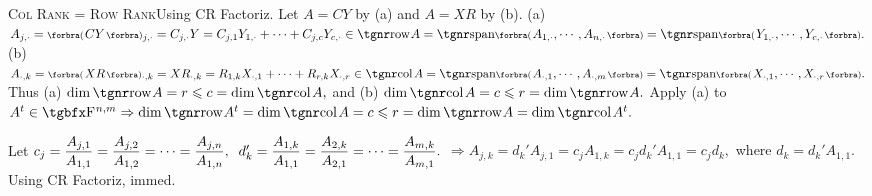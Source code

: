\SepLine

\BulletPointX\textsc{Col Rank = Row Rank}\quad Using CR Factoriz. Let $A=CY$ by (a) and $A=XR$ by (b).\TextB{}
(a) $A_{j,\cdot}=\BigPar{CY}{_{j,\cdot}}=C_{j,\cdot}Y=C_{j,1}Y_{1,\cdot}+\dots+C_{j,c}Y_{c,\cdot}\in\row A=\Span[\BigPar]{A_{1,\cdot},\cdots,A_{n,\cdot}}=\Span[\BigPar]{Y_{1,\cdot},\cdots,Y_{c,\cdot}}.$\TextB{}
(b) $A_{\cdot,k}=\BigPar{XR}{_{\cdot,k}}=XR_{\cdot,k}=R_{1,k}X_{\cdot,1}+\dots+R_{r,k}X_{\cdot,r}\in\col A=\Span[\BigPar]{A_{\cdot,1},\cdots,A_{\cdot,m}}=\Span[\BigPar]{X_{\cdot,1},\cdots,X_{\cdot,r}}.$\TextB{}
Thus (a) $\dim\row A=r\leqslant c=\dim\col A,$ and (b) $\dim\col A=c\leqslant r=\dim\row A.$\vspace{2pt}\PfEnd\TextB{}
\Or Apply (a) to $A^t\in\FbbP{n,m}\Rightarrow\dim\row A^t=\dim\col A=c\leqslant r=\dim\row A=\dim\col A^t.$\PfEnd
\SepLine

Let $c_j={\displaystyle{\frac{A_{j,1}}{A_{1,1}}}}={\displaystyle{\frac{A_{j,2}}{A_{1,2}}}}=\dots={\displaystyle{\frac{A_{j,n}}{A_{1,n}}}},\;\;d_k'={\displaystyle{\frac{A_{1,k}}{A_{1,1}}}}={\displaystyle{\frac{A_{2,k}}{A_{2,1}}}}=\dots={\displaystyle{\frac{A_{m,k}}{A_{m,1}}}}.$\vspace{4pt}\parSol{}
{$\Rightarrow A_{j,k}=d_k' A_{j,1}=c_j A_{1,k}=c_j d_k' A_{1,1}=c_j d_k,$ where $d_k=d_k' A_{1,1}.$}\quad\Or Using CR Factoriz, immed.\PfEnd
\SepLine

